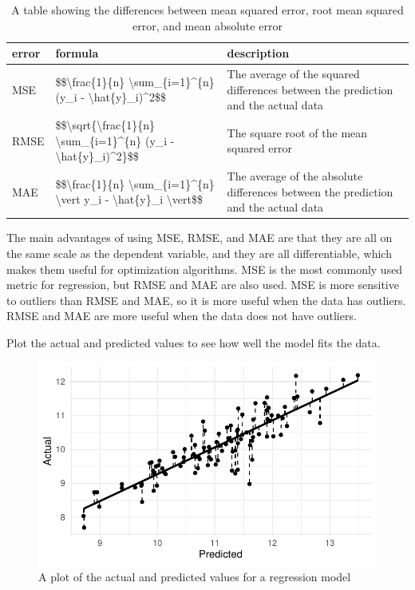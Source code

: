 \documentclass[
  letterpaper,
]{scrbook}
\begin{document}
\hypertarget{tbl-pda-error-metrics}{}
\begin{table}
\caption{\label{tbl-pda-error-metrics}A table showing the differences between mean squared error, root mean
squared error, and mean absolute error }\tabularnewline

\centering
\begin{tabular}{l|l|l}
\hline
error & formula & description\\
\hline
MSE & \$\$\textbackslash{}frac\{1\}\{n\} \textbackslash{}sum\_\{i=1\}\textasciicircum{}\{n\} (y\_i - \textbackslash{}hat\{y\}\_i)\textasciicircum{}2\$\$ & The average of the squared differences between the prediction and the actual data\\
\hline
RMSE & \$\$\textbackslash{}sqrt\{\textbackslash{}frac\{1\}\{n\} \textbackslash{}sum\_\{i=1\}\textasciicircum{}\{n\} (y\_i - \textbackslash{}hat\{y\}\_i)\textasciicircum{}2\}\$\$ & The square root of the mean squared error\\
\hline
MAE & \$\$\textbackslash{}frac\{1\}\{n\} \textbackslash{}sum\_\{i=1\}\textasciicircum{}\{n\} \textbackslash{}vert y\_i - \textbackslash{}hat\{y\}\_i \textbackslash{}vert\$\$ & The average of the absolute differences between the prediction and the actual data\\
\hline
\end{tabular}
\end{table}

The main advantages of using MSE, RMSE, and MAE are that they are all on
the same scale as the dependent variable, and they are all
differentiable, which makes them useful for optimization algorithms. MSE
is the most commonly used metric for regression, but RMSE and MAE are
also used. MSE is more sensitive to outliers than RMSE and MAE, so it is
more useful when the data has outliers. RMSE and MAE are more useful
when the data does not have outliers.

Plot the actual and predicted values to see how well the model fits the
data.

\begin{figure}[h]

{\centering \includegraphics{./prediction_files/figure-pdf/pda-regression-plot-1.pdf}

}

\caption{A plot of the actual and predicted values for a regression
model}

\end{figure}
\end{document}
